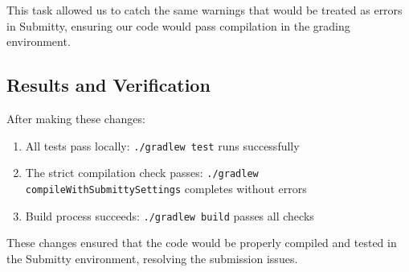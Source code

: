 \documentclass[11pt]{article}
\begin{document}
This task allowed us to catch the same warnings that would be treated as errors in Submitty, ensuring our code would pass compilation in the grading environment.

\subsection*{Results and Verification}

After making these changes:
\begin{enumerate}
    \item All tests pass locally: \texttt{./gradlew test} runs successfully
    \item The strict compilation check passes: \texttt{./gradlew compileWithSubmittySettings} completes without errors
    \item Build process succeeds: \texttt{./gradlew build} passes all checks
\end{enumerate}

These changes ensured that the code would be properly compiled and tested in the Submitty environment, resolving the submission issues.
\end{document}
